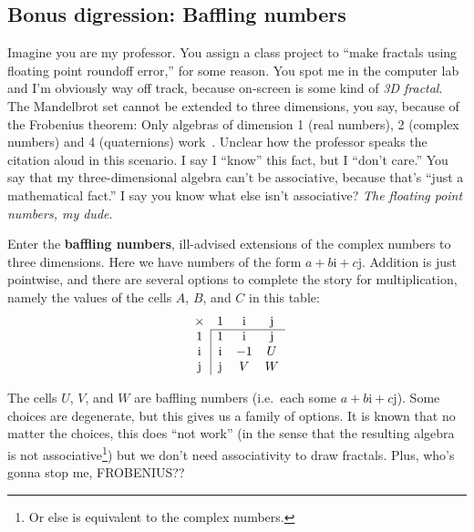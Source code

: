 \documentclass[twocolumn]{article}
\begin{document}
\subsection{Bonus digression: Baffling numbers}
Imagine you are my professor. You assign a class project to ``make
fractals using floating point roundoff error,'' for some reason. You
spot me in the computer lab and I'm obviously way off track, because
on-screen is some kind of {\Large \it 3D fractal}. The Mandelbrot set cannot
be extended to three dimensions, you say, because of the Frobenius
theorem: Only algebras of dimension 1 (real numbers), 2 (complex
numbers) and 4 (quaternions) work~\cite{frobenius1878lineare}. Unclear
how the professor speaks the citation aloud in this scenario. I say I
``know'' this fact, but I ``don't care.'' You say that my
three-dimensional algebra can't be associative, because that's ``just
a mathematical fact.'' I say you know what else isn't associative?
{\em The floating point numbers, my dude}.

Enter the {\bf baffling numbers}, ill-advised extensions of the
complex numbers to three dimensions. Here we have numbers of the form
$a + b\mathrm{i} + c\mathrm{j}$. Addition is just pointwise, and there
are several options to complete the story for multiplication, namely
the values of the cells $A$, $B$, and $C$ in this table:
%
\[
\begin{array}{c|ccc}
  \multicolumn{1}{c}{\times} & 1          &  \mathrm{i} & \mathrm{j} \\
  \cline{2-4}
  1          & 1          &  \mathrm{i} & \mathrm{j} \\
  \mathrm{i} & \mathrm{i} & -1          & U \\
  \mathrm{j} & \mathrm{j} &  V          & W \\
\end{array}
\]




The cells $U$, $V$, and $W$ are baffling numbers (i.e.~each some
$a + b\mathrm{i} + c\mathrm{j}$). Some choices are
degenerate, but this gives us a family of options. It is known that no
matter the choices, this does ``not work'' (in the sense that the
resulting algebra is not associative\footnote{Or else is equivalent to
  the complex numbers.}) but we don't need associativity to draw
fractals. Plus, who's gonna stop me, FROBENIUS??
\end{document}

